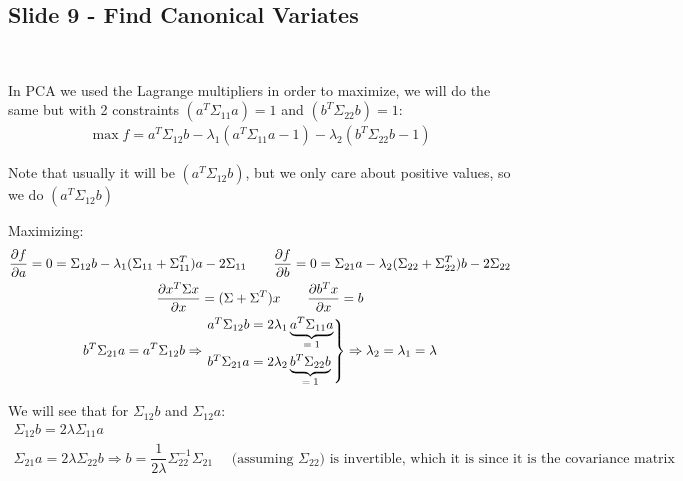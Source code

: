 \subsection{Slide 9 - Find Canonical Variates}\hfill\\\par
\noindent In PCA we used the Lagrange multipliers in order to maximize, we will do the same but with 2 constraints $(a^T\Sigma_{11}a) = 1$ and $(b^T\Sigma_{22}b) = 1$:
\begin{equation*}
  \begin{gathered}
    \max{f} = a^T\Sigma_{12}b-\lambda_1(a^T\Sigma_{11}a-1)-\lambda_2(b^T\Sigma_{22}b-1)
  \end{gathered}
\end{equation*}\par
\noindent Note that usually it will be $(a^T\Sigma_{12}b)$, but we only care about positive values, so we do $(a^T\Sigma_{12}b)$\par
\noindent Maximizing:
\begin{equation*}
  \begin{gathered}
    \dfrac{\partial f}{\partial a} = 0 = \Sigma_{12}b-\lambda_1(\Sigma_{11}+\Sigma_{11}^T)a-2\Sigma_{11}\qquad \dfrac{\partial f}{\partial b} = 0 = \Sigma_{21}a-\lambda_2(\Sigma_{22}+\Sigma_{22}^T)b-2\Sigma_{22}\\
    \dfrac{\partial x^T\Sigma x}{\partial x} = (\Sigma+\Sigma^T)x\qquad \dfrac{\partial b^Tx}{\partial x} = b\\
    b^T\Sigma_{21}a = a^T\Sigma_{12}b\Rightarrow
    \begin{rcases*}
      a^T\Sigma_{12}b = 2\lambda_1 \underbrace{a^T\Sigma_{11}a}_{\text{$=1$}}\\
      b^T\Sigma_{21}a = 2\lambda_2 \underbrace{b^T\Sigma_{22}b}_{\text{$=1$}}
    \end{rcases*}\Rightarrow \lambda_2 = \lambda_1 = \lambda
  \end{gathered}
\end{equation*}
\par\bigskip
\noindent We will see that for $\Sigma_{12}b$ and $\Sigma_{12}a$:
\begin{equation*}
  \begin{gathered}
    \Sigma_{12}b = 2\lambda\Sigma_{11}a\\
    \Sigma_{21}a = 2\lambda\Sigma_{22}b\Rightarrow b = \dfrac{1}{2\lambda}\Sigma_{22}^{-1}\Sigma_{21} \quad\text{ (assuming $\Sigma_{22}$) is invertible, which it is since it is the covariance matrix}
  \end{gathered}
\end{equation*}\par
